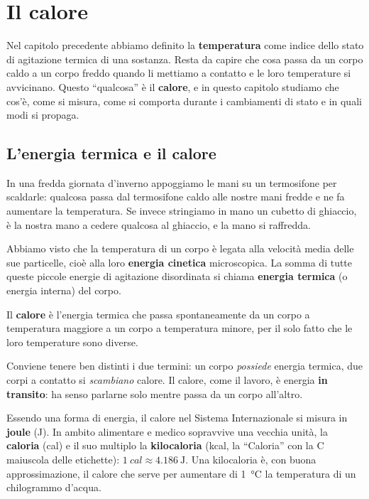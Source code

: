 \chapter{Il calore}

Nel capitolo precedente abbiamo definito la \textbf{temperatura} come indice dello stato di agitazione termica di una sostanza. Resta da capire che cosa passa da un corpo caldo a un corpo freddo quando li mettiamo a contatto e le loro temperature si avvicinano. Questo ``qualcosa'' è il \textbf{calore}, e in questo capitolo studiamo che cos'è, come si misura, come si comporta durante i cambiamenti di stato e in quali modi si propaga.

\section[L'energia termica e il calore]{L'energia termica e il calore}

In una fredda giornata d'inverno appoggiamo le mani su un termosifone per scaldarle: qualcosa passa dal termosifone caldo alle nostre mani fredde e ne fa aumentare la temperatura. Se invece stringiamo in mano un cubetto di ghiaccio, è la nostra mano a cedere qualcosa al ghiaccio, e la mano si raffredda.

Abbiamo visto che la temperatura di un corpo è legata alla velocità media delle sue particelle, cioè alla loro \textbf{energia cinetica} microscopica. La somma di tutte queste piccole energie di agitazione disordinata si chiama \textbf{energia termica} (o energia interna) del corpo.

\begin{definizione}
Il \textbf{calore} è l'energia termica che passa spontaneamente da un corpo a temperatura maggiore a un corpo a temperatura minore, per il solo fatto che le loro temperature sono diverse.
\end{definizione}

Conviene tenere ben distinti i due termini: un corpo \emph{possiede} energia termica, due corpi a contatto si \emph{scambiano} calore. Il calore, come il lavoro, è energia \textbf{in transito}: ha senso parlarne solo mentre passa da un corpo all'altro.

\begin{remark}
Essendo una forma di energia, il calore nel Sistema Internazionale si misura in \textbf{joule} (\si{\joule}). In ambito alimentare e medico sopravvive una vecchia unità, la \textbf{caloria} (cal) e il suo multiplo la \textbf{kilocaloria} (kcal, la ``Caloria'' con la C maiuscola delle etichette): $\SI{1}{cal} \approx \SI{4,186}{\joule}$. Una kilocaloria è, con buona approssimazione, il calore che serve per aumentare di \SI{1}{\celsius} la temperatura di un chilogrammo d'acqua.
\end{remark}

